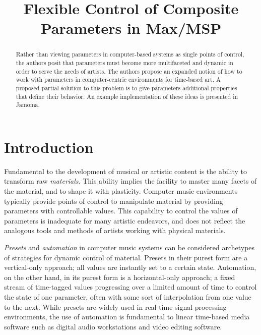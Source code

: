 \documentclass{article}
\title{Flexible Control of Composite Parameters in Max/MSP}
\begin{document}
%
\maketitle
%
\sloppy

\begin{abstract}
Rather than viewing parameters in computer-based systems as single points of control, the authors posit that parameters must become more multifaceted and dynamic in order to serve the needs of artists. The authors propose an expanded notion of how to work with parameters in computer-centric environments for time-based art. A proposed partial solution to this problem is to give parameters additional properties that define their behavior. An example implementation of these ideas is presented in Jamoma. 

\end{abstract}


\section{Introduction} %
\label{sec:introduction}

Fundamental to the development of musical or artistic content is the ability to transform raw \emph{materials}. This ability implies the facility to master many facets of the material, and to shape it with plasticity. Computer music environments typically provide points of control to manipulate material by providing parameters with controllable values. This capability to control the values of parameters is inadequate for many artistic endeavors, and does not reflect the analogous tools and methods of artists working with physical materials.

\emph{Presets} and \emph{automation} in computer music systems can be considered archetypes of strategies for dynamic control of material. Presets in their purest form are a vertical-only approach; all values are instantly set to a certain state. Automation, on the other hand, in its purest form is a horizontal-only approach; a fixed stream of time-tagged values progressing over a limited amount of time to control the state of one parameter, often with some sort of interpolation from one value to the next. While presets are widely used in real-time signal processing environments, the use of automation is fundamental to linear time-based media software such as digital audio workstations and video editing software.
\end{document}
